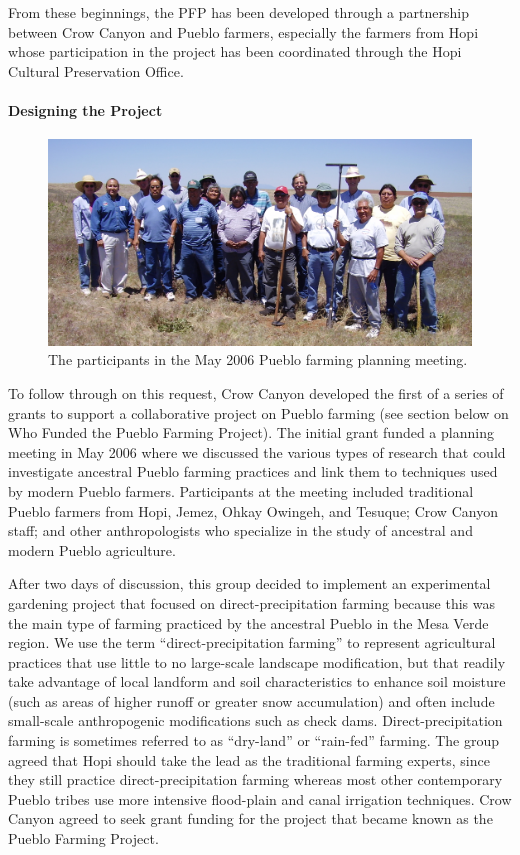 \documentclass[12pt,]{article}
\let\oldparagraph\paragraph
\renewcommand{\paragraph}[1]{\oldparagraph{#1}\mbox{}}
\begin{document}
From these beginnings, the PFP has been developed through a partnership between Crow Canyon and Pueblo farmers, especially the farmers from Hopi whose participation in the project has been coordinated through the Hopi Cultural Preservation Office.

\hypertarget{designing-the-project}{%
\paragraph{Designing the Project}\label{designing-the-project}}

\begin{figure}
\centering
\includegraphics{./images/2006_group.jpg}
\caption{The participants in the May 2006 Pueblo farming planning meeting.}
\end{figure}

To follow through on this request, Crow Canyon developed the first of a series of grants to support a collaborative project on Pueblo farming (see section below on Who Funded the Pueblo Farming Project). The initial grant funded a planning meeting in May 2006 where we discussed the various types of research that could investigate ancestral Pueblo farming practices and link them to techniques used by modern Pueblo farmers. Participants at the meeting included traditional Pueblo farmers from Hopi, Jemez, Ohkay Owingeh, and Tesuque; Crow Canyon staff; and other anthropologists who specialize in the study of ancestral and modern Pueblo agriculture.

After two days of discussion, this group decided to implement an experimental gardening project that focused on direct-precipitation farming because this was the main type of farming practiced by the ancestral Pueblo in the Mesa Verde region. We use the term ``direct-precipitation farming'' to represent agricultural practices that use little to no large-scale landscape modification, but that readily take advantage of local landform and soil characteristics to enhance soil moisture (such as areas of higher runoff or greater snow accumulation) and often include small-scale anthropogenic modifications such as check dams. Direct-precipitation farming is sometimes referred to as ``dry-land'' or ``rain-fed'' farming. The group agreed that Hopi should take the lead as the traditional farming experts, since they still practice direct-precipitation farming whereas most other contemporary Pueblo tribes use more intensive flood-plain and canal irrigation techniques. Crow Canyon agreed to seek grant funding for the project that became known as the Pueblo Farming Project.
\end{document}

